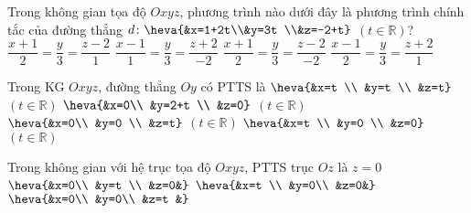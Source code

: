 	\begin{ex}%
		Trong không gian tọa độ $Oxyz$, phương trình nào dưới đây là phương trình chính tắc của đường thẳng $d\colon\heva{&x=1+2t\\&y=3t \\&z=-2+t}$ $(t\in\mathbb{R})$?
		\choice
		{$\dfrac{x+1}{2}=\dfrac{y}{3}=\dfrac{z-2}{1}$}
		{$\dfrac{x-1}{1}=\dfrac{y}{3}=\dfrac{z+2}{-2}$}
		{$\dfrac{x+1}{2}=\dfrac{y}{3}=\dfrac{z-2}{-2}$}
		{\True $\dfrac{x-1}{2}=\dfrac{y}{3}=\dfrac{z+2}{1}$}
\end{ex}
\begin{ex}%
	Trong KG $Oxyz$, đường thẳng $Oy$ có PTTS là
	\choice
	{$\heva{&x=t \\
		&y=t \\
		&z=t}$ $(t \in \mathbb{R})$} 
	{\True $\heva{&x=0\\
		&y=2+t \\
		&z=0}$ $(t \in \mathbb{R})$}
	{$\heva{&x=0\\
		&y=0 \\
		&z=t}$ $(t \in \mathbb{R})$}
	{$\heva{&x=t \\
		&y=0 \\
		&z=0}$ $(t \in \mathbb{R})$}
\end{ex}
\begin{ex}%
	Trong không gian với hệ trục tọa độ $Oxyz$, PTTS trục $Oz$ là
	\choice
	{$z=0$}
	{$\heva{&x=0\\
			&y=t \\
			&z=0&}$}
	{$\heva{&x=t \\
			&y=0\\
			&z=0&}$}
	{\True $\heva{&x=0\\
			&y=0\\
			&z=t
			&}$}
\end{ex}
